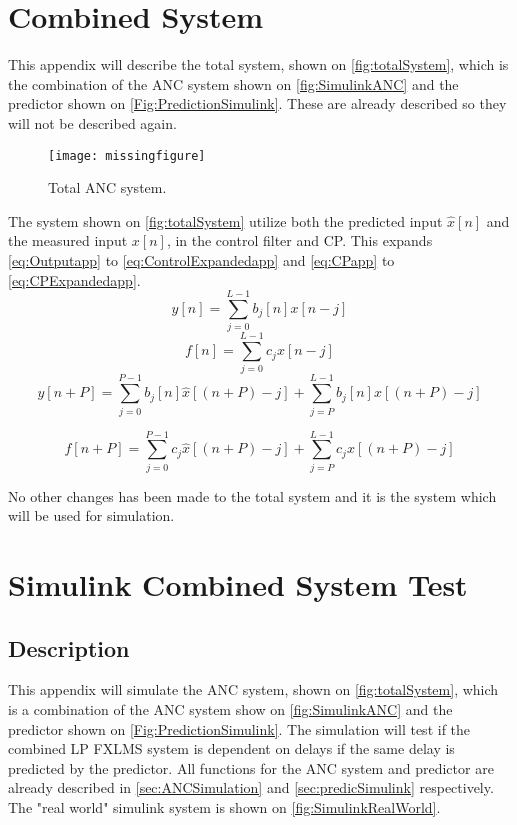 \section{Combined System} \label{sec:TotalSystem}
This appendix will describe the total system, shown on \autoref{fig:totalSystem}, which is the combination of the ANC system shown on \autoref{fig:SimulinkANC} and the predictor shown on \autoref{Fig:PredictionSimulink}. These are already described so they will not be described again. 
\begin{figure}[H]
	\centering
	\texttt{[image: missingfigure]}
	\caption{Total ANC system. }
	\label{fig:totalSystem}
\end{figure}
The system shown on \autoref{fig:totalSystem} utilize both the predicted input $\hat{x}[n]$ and the measured input $x[n]$, in the control filter and CP. This expands \autoref{eq:Outputapp} to \autoref{eq:ControlExpandedapp} and \autoref{eq:CPapp} to \autoref{eq:CPExpandedapp}.
\begin{equation}\label{eq:Outputapp}
y[n]=\sum_{j=0}^{L-1}b_j[n]x[n-j]
\end{equation}
\begin{equation}\label{eq:CPapp}
f[n]=\sum_{j=0}^{L-1}c_jx[n-j]
\end{equation}
\begin{equation}\label{eq:ControlExpandedapp}
y[n+P]=\sum^{P-1}_{j=0}b_j[n]\hat{x}[(n+P)-j]+\sum^{L-1}_{j=P}b_j[n]x[(n+P)-j]
\end{equation}

\begin{equation}\label{eq:CPExpandedapp}
f[n+P]=\sum^{P-1}_{j=0}c_j\hat{x}[(n+P)-j]+\sum^{L-1}_{j=P}c_jx[(n+P)-j]
\end{equation}

No other changes has been made to the total system and it is the system which will be used for simulation.

\newpage
\section{Simulink Combined System Test} \label{sec:SimulinkTotalSystem}

\subsection{Description}
This appendix will simulate the ANC system, shown on \autoref{fig:totalSystem}, which is a combination of the ANC system show on \autoref{fig:SimulinkANC} and the predictor shown on \autoref{Fig:PredictionSimulink}. The simulation will test if the combined LP FXLMS system is dependent on delays if the same delay is predicted by the predictor. All functions for the ANC system and predictor are already described in \autoref{sec:ANCSimulation} and \autoref{sec:predicSimulink} respectively. The "real world" simulink system is shown on \autoref{fig:SimulinkRealWorld}.

